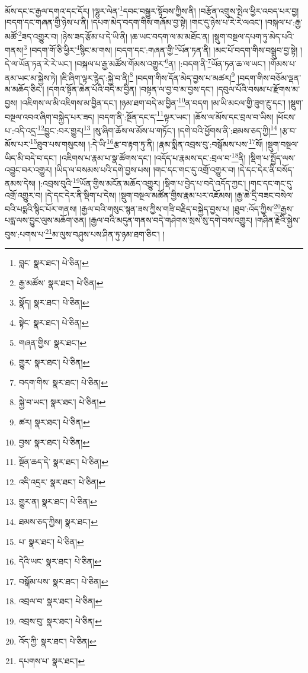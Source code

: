 མོས་དང་ང་རྒྱལ་དགའ་དང་དོར། །ལྷུར་ལེན་\footnote{བླང་  སྣར་ཐང་།  པེ་ཅིན། }དབང་བསྒྱུར་སྟོབས་ཀྱིས་ནི། །བརྩོན་འགྲུས་སྤེལ་ཕྱིར་འབད་པར་བྱ། །བདག་དང་གཞན་གྱི་ཉེས་པ་ནི། །དཔག་མེད་བདག་གིས་གཞོམ་བྱ་སྟེ། །གང་དུ་ཉེས་པ་རེ་རེ་ལའང་། །བསྐལ་པ་:རྒྱ་མཚོ་\footnote{རྒྱ་མཚོས་  སྣར་ཐང་།  པེ་ཅིན། }ཟད་འགྱུར་བ། །ཉེས་ཟད་རྩོམ་པ་དེ་ཡི་ནི། །ཆ་ཡང་བདག་ལ་མ་མཐོང་ན། །སྡུག་བསྔལ་དཔག་ཏུ་མེད་པའི་གནས།\footnote{སྣོད།  སྣར་ཐང་།  པེ་ཅིན། } །བདག་གོ་ཅི་ཕྱིར་\footnote{སྟེང་  སྣར་ཐང་།  པེ་ཅིན། }སྙིང་མ་གས། །བདག་དང་:གཞན་གྱི་\footnote{གཞན་གྱིས་  སྣར་ཐང་། }ཡོན་ཏན་ནི། །མང་པོ་བདག་གིས་བསྒྲུབ་བྱ་སྟེ། །དེ་ལ་ཡོན་ཏན་རེ་རེ་ཡང་། །བསྐལ་པ་རྒྱ་མཚོས་གོམས་འགྱུར་\footnote{གྱུར་  སྣར་ཐང་།  པེ་ཅིན། }ན། །:བདག་ནི་\footnote{བདག་གིས་  སྣར་ཐང་།  པེ་ཅིན། }ཡོན་ཏན་ཆ་ལ་ཡང་། །གོམས་པ་ནམ་ཡང་མ་སྐྱེས་ཏེ། །ཇི་ཞིག་ལྟར་རྙེད་:སྐྱེ་བ་ནི།\footnote{སྐྱེ་བ་ཡང་།  སྣར་ཐང་།  པེ་ཅིན། } །བདག་གིས་དོན་མེད་བྱས་པ་མཚར།\footnote{ཚར།  སྣར་ཐང་།  པེ་ཅིན། } །བདག་གིས་བཅོམ་ལྡན་མ་མཆོད་ཅིང་། །དགའ་སྟོན་ཆེན་པོའི་བདེ་མ་བྱིན། །བསྟན་ལ་བྱ་བ་མ་བྱས་དང་། །དབུལ་པོའི་བསམ་པ་རྫོགས་མ་བྱས། །འཇིགས་ལ་མི་འཇིགས་མ་བྱིན་དང་། །ཉམ་ཐག་བདེ་མ་བྱིན་\footnote{བྱས་  སྣར་ཐང་།  པེ་ཅིན། }ན་བདག །མ་ཡི་མངལ་གྱི་ཟུག་རྔུ་དང་། །སྡུག་བསྔལ་འབའ་ཞིག་བསྐྱེད་པར་ཟད། །བདག་ནི་:སྔོན་དང་ད་\footnote{སྔོན་ཆད་དེ་  སྣར་ཐང་།  པེ་ཅིན། }ལྟར་ཡང་། །ཆོས་ལ་མོས་དང་བྲལ་བ་ཡིས། །ཕོངས་པ་:འདི་འདྲ་\footnote{འདི་འདྲར་  སྣར་ཐང་།  པེ་ཅིན། }བྱུང་:བར་གྱུར།\footnote{གྱུར་ན།  སྣར་ཐང་།  པེ་ཅིན། } །སུ་ཞིག་ཆོས་ལ་མོས་པ་གཏོང་། །དགེ་བའི་ཕྱོགས་ནི་:ཐམས་ཅད་ཀྱི།\footnote{ཐམས་ཅད་ཀྱིས།  སྣར་ཐང་། } །རྩ་བ་མོས་པར་\footnote{པ་  སྣར་ཐང་།  པེ་ཅིན། }ཐུབ་པས་གསུངས། །:དེ་ཡི་\footnote{དེའི་ཡང་  སྣར་ཐང་།  པེ་ཅིན། }རྩ་བ་རྟག་ཏུ་ནི། །རྣམ་སྨིན་འབྲས་བུ་:བསྒོམས་པས་\footnote{བསྒོམ་པས་  སྣར་ཐང་།  པེ་ཅིན། }སོ། །སྡུག་བསྔལ་ཡིད་མི་བདེ་བ་དང་། །འཇིགས་པ་རྣམ་པ་སྣ་ཚོགས་དང་། །འདོད་པ་རྣམས་དང་:བྲལ་བ་\footnote{འབྲལ་བ་  སྣར་ཐང་།  པེ་ཅིན། }ནི། །སྡིག་པ་སྤྱོད་ལས་འབྱུང་བར་འགྱུར། །ཡིད་ལ་བསམས་པའི་དགེ་བྱས་པས། །གང་དང་གང་དུ་འགྲོ་འགྱུར་བ། །དེ་དང་དེར་ནི་བསོད་ནམས་དེས། །:འབྲས་བུའི་\footnote{འབྲས་བུ་  སྣར་ཐང་།  པེ་ཅིན། }ཡོན་གྱིས་མངོན་མཆོད་འགྱུར། །སྡིག་པ་བྱེད་པ་བདེ་འདོད་ཀྱང་། །གང་དང་གང་དུ་འགྲོ་འགྱུར་བ། །དེ་དང་དེར་ནི་སྡིག་པ་དེས། །སྡུག་བསྔལ་མཚོན་གྱིས་རྣམ་པར་འཇོམས། །རྒྱ་ཆེ་དྲི་བཟང་བསེལ་བའི་པདྨའི་སྙིང་པོར་གནས། །རྒྱལ་བའི་གསུང་སྙན་ཟས་ཀྱིས་གཟི་བརྗིད་བསྐྱེད་བྱས་པ། །ཐུབ་:འོད་ཀྱིས་\footnote{འོད་ཀྱི་  སྣར་ཐང་།  པེ་ཅིན། }རྒྱས་པདྨ་ལས་བྱུང་ལུས་མཆོག་ཅན། །རྒྱལ་བའི་མདུན་གནས་བདེ་གཤེགས་སྲས་སུ་དགེ་བས་འགྱུར། །གཤིན་རྗེའི་སྐྱེས་བུས་:པགས་པ་\footnote{དཔགས་པ་  སྣར་ཐང་། }མ་ལུས་བཤུས་པས་ཤིན་ཏུ་ཉམ་ཐག་ཅིང་། །
